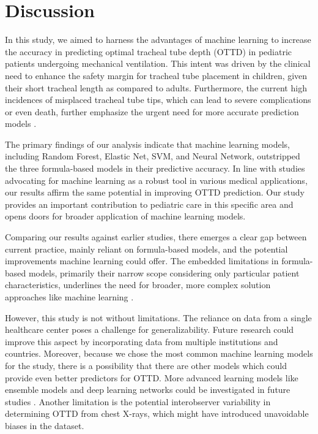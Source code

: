 \documentclass[11pt]{article}
\begin{document}
\section*{Discussion}

In this study, we aimed to harness the advantages of machine learning to increase the accuracy in predicting optimal tracheal tube depth (OTTD) in pediatric patients undergoing mechanical ventilation. This intent was driven by the clinical need to enhance the safety margin for tracheal tube placement in children, given their short tracheal length as compared to adults. Furthermore, the current high incidences of misplaced tracheal tube tips, which can lead to severe complications or even death, further emphasize the urgent need for more accurate prediction models \cite{Kerrey2009APC, Rey2009MechanicalCD, Rost2022TrachealTM}.

The primary findings of our analysis indicate that machine learning models, including Random Forest, Elastic Net, SVM, and Neural Network, outstripped the three formula-based models in their predictive accuracy. In line with studies advocating for machine learning as a robust tool in various medical applications\cite{Crowson2021MachineLF, Crowson2022HumanVM}, our results affirm the same potential in improving OTTD prediction. Our study provides an important contribution to pediatric care in this specific area and opens doors for broader application of machine learning models.

Comparing our results against earlier studies, there emerges a clear gap between current practice, mainly reliant on formula-based models, and the potential improvements machine learning could offer. The embedded limitations in formula-based models, primarily their narrow scope considering only particular patient characteristics, underlines the need for broader, more complex solution approaches like machine learning \cite{Jin2021HierarchicalAM}.

However, this study is not without limitations. The reliance on data from a single healthcare center poses a challenge for generalizability. Future research could improve this aspect by incorporating data from multiple institutions and countries. Moreover, because we chose the most common machine learning models for the study, there is a possibility that there are other models which could provide even better predictors for OTTD. More advanced learning models like ensemble models and deep learning networks could be investigated in future studies \cite{Jin2021HierarchicalAM}. Another limitation is the potential interobserver variability in determining OTTD from chest X-rays, which might have introduced unavoidable biases in the dataset.
\end{document}
